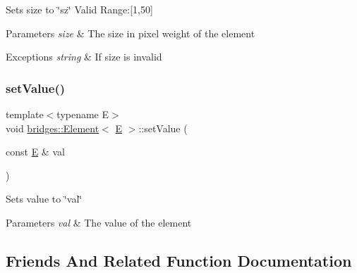 Sets size to \char`\"{}sz\char`\"{} Valid Range\+:\mbox{[}1,50\mbox{]}


\begin{DoxyParams}{Parameters}
{\em size} & The size in pixel weight of the element \\
\hline
\end{DoxyParams}

\begin{DoxyExceptions}{Exceptions}
{\em string} & If size is invalid \\
\hline
\end{DoxyExceptions}
\mbox{\label{classbridges_1_1_element_a737cb19281b6aa45a5a1dc9d592dad93}} 
\subsubsection{\texorpdfstring{setValue()}{setValue()}}
{\footnotesize\ttfamily template$<$typename E$>$ \\
void \mbox{\hyperlink{classbridges_1_1_element}{bridges\+::\+Element}}$<$ \mbox{\hyperlink{namespacebridges_acfb0a4f7877d8f63de3e6862004c50eda3a3ea00cfc35332cedf6e5e9a32e94da}{E}} $>$\+::set\+Value (\begin{DoxyParamCaption}\item[{const \mbox{\hyperlink{namespacebridges_acfb0a4f7877d8f63de3e6862004c50eda3a3ea00cfc35332cedf6e5e9a32e94da}{E}} \&}]{val }\end{DoxyParamCaption})\hspace{0.3cm}{\ttfamily [inline]}}

Sets value to \char`\"{}val\char`\"{}


\begin{DoxyParams}{Parameters}
{\em val} & The value of the element \\
\hline
\end{DoxyParams}


\subsection{Friends And Related Function Documentation}
\mbox{\label{classbridges_1_1_element_ab1a595168ea1870ce436dfd2d8e69b6d}} 
